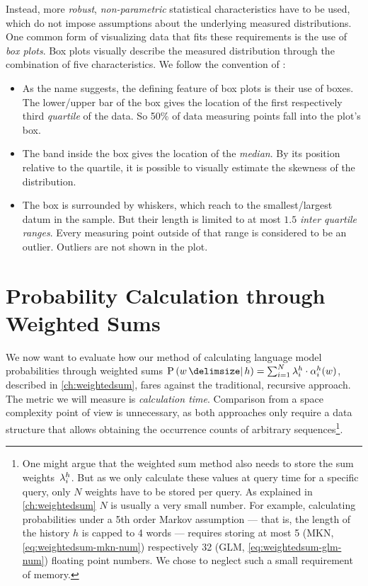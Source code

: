 Instead, more \emph{robust}, \emph{non-parametric} statistical characteristics
have to be used, which do not impose assumptions about the underlying
measured distributions.
One common form of visualizing data that fits these requirements is the use of
\emph{box plots}.
Box plots visually describe the measured distribution through the combination of
five characteristics.
We follow the convention of \textcite{Tukey1977}:
\begin{itemize}
  \item As the name suggests, the defining feature of box plots is their use of
    boxes.
    The lower/upper bar of the box gives the location of the first
    respectively third \emph{quartile} of the data.
    So 50\% of data measuring points fall into the plot's box.
  \item The band inside the box gives the location of the \emph{median}.
    By its position relative to the quartile, it is possible to visually estimate
    the skewness of the distribution.
  \item The box is surrounded by whiskers, which reach to the smallest/largest
    datum in the sample.
    But their length is limited to at most $1.5$ \emph{inter quartile ranges}.
    Every measuring point outside of that range is considered to be an outlier.
    Outliers are not shown in the plot.
\end{itemize}

\section{Probability Calculation through Weighted Sums}
\label{sec:evaluation-weightedsum}

We now want to evaluate how our method of calculating language model
probabilities through weighted sums
\mbox{$\Prob{w}{h} = \sum_{i = 1}^{N} \SumWeight^h_i \cdot \SumArg_i^h(w)$},
described in \cref{ch:weightedsum}, fares against the traditional, recursive
approach.
The metric we will measure is \emph{calculation time}.
Comparison from a space complexity point of view is unnecessary, as both
approaches only require a data structure that allows obtaining the occurrence
counts of arbitrary sequences\footnote{One might argue that the weighted sum
method also needs to store the sum weights~$\lambda^h_i$. But as we only
calculate these values at query time for a specific query, only $N$ weights have
to be stored per query. As explained in \cref{ch:weightedsum} $N$ is usually a
very small number. For example, calculating probabilities under a 5th order
Markov assumption --- that is, the length of the history $h$ is capped to 4 words
--- requires storing at most 5 (MKN, \cref{eq:weightedsum-mkn-num}) respectively
32 (GLM, \cref{eq:weightedsum-glm-num}) floating point numbers.
We chose to neglect such a small requirement of memory.}.

